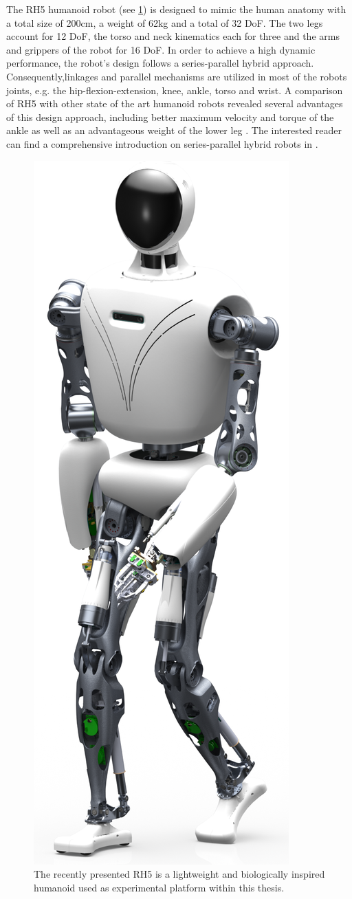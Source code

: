 The RH5 humanoid robot (see \cref{img:rh5_robot}) is designed to mimic the human anatomy with a total size of 200cm, a weight of 62kg and a total of 32 \gls{DoF}. The two legs account for 12 \gls{DoF}, the torso and neck kinematics each for three and the arms and grippers of the robot for 16 \gls{DoF}. In order to achieve a high dynamic performance, the robot's design follows a series-parallel hybrid approach. Consequently,linkages and parallel mechanisms are utilized in most of the robots joints, e.g. the hip-flexion-extension, knee, ankle, torso and wrist. A comparison of RH5 with other state of the art humanoid robots revealed several advantages of this design approach, including better maximum velocity and torque of the ankle as well as an advantageous weight of the lower leg \cite{kumar2020survey}. The interested reader can find a comprehensive introduction on series-parallel hybrid robots in \cite[Ch.2]{kumar2019modular}. 

\begin{figure}[h!]
\centering	
\includegraphics[width=.3\textwidth]{img/rh5_robot.png}
\caption{The recently presented RH5 is a lightweight and biologically inspired humanoid used as experimental platform within this thesis.}
\label{img:rh5_robot}
\end{figure} 

